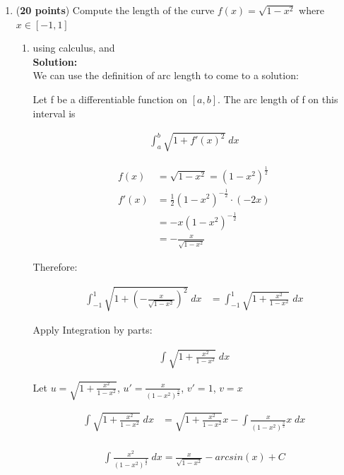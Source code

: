 \documentclass[a4paper]{article}
\begin{document}
\begin{enumerate}
\begin{enumerate}
	
\end{enumerate}



\item (\textbf{20 points}) Compute the length of the curve $f(x) = \sqrt{1-x^2}$ where $x \in [-1,1]$


\begin{enumerate}
	\item using calculus, and\\
	\textbf{Solution:}\\
	
We can use the definition of arc length to come to a solution:

Let f be a differentiable function on $[a,b]$. The arc length of f on this interval is

\begin{align*}
	\int_a^b \sqrt{1 + f'(x)^2} \; dx
\end{align*}	
	
\begin{align*}
	f(x) &= \sqrt{1 - x^2} = (1 - x^2)^\frac{1}{2}\\
	f'(x) &= \frac{1}{2} (1 - x^2)^{-\frac{1}{2}} \cdot (-2x)\\
	&= - x(1 - x^2)^{-\frac{1}{2}}\\
	&= - \frac{x}{\sqrt{1 - x^2}}
\end{align*}

Therefore:

\begin{align*}
	\int_{-1}^1 \sqrt{1 + \left( -\frac{x}{\sqrt{1 - x^2}} \right)^2} \; dx &= \int_{-1}^1 \sqrt{1 + \frac{x^2}{1 - x^2}} \; dx
\end{align*}	
	
Apply Integration by parts:

\begin{align*}
	\int \sqrt{1 + \frac{x^2}{1 - x^2}} \; dx
\end{align*}	

Let $u = \sqrt{1 + \frac{x^2}{1 - x^2}}$,
$u' = \frac{x}{(1 - x^2)^\frac{3}{2}}$, $v' = 1$, $v = x$	
	
\begin{align*}
	\int \sqrt{1 + \frac{x^2}{1 - x^2}} \; dx &= \sqrt{1 + \frac{x^2}{1 - x^2}}x - \int \frac{x}{(1 - x^2)^\frac{3}{2}}x \;dx\\
\end{align*}		
	
\begin{align*}
\int \frac{x^2}{(1 - x^2)^\frac{3}{2}}\;dx = \frac{x}{\sqrt{1 - x^2}} - arcsin(x) + C
\end{align*}	
	

\end{enumerate}
\end{enumerate}
\end{document}
